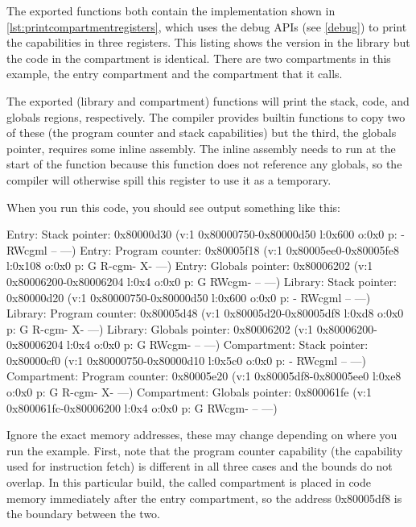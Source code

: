 \codelisting[filename=examples/library_or_compartment/interface.h,marker=exports,label=lst:exportcompartmentandlib,caption="A header defining library and compartment exports."]{}

The exported functions both contain the implementation shown in \ref{lst:printcompartmentregisters}, which uses the debug APIs (see \ref{debug}) to print the capabilities in three registers.
This listing shows the version in the library but the code in the compartment is identical.
There are two compartments in this example, the entry compartment and the compartment that it calls.

The exported (library and compartment) functions will print the stack, code, and globals regions, respectively.
The compiler provides builtin functions to copy two of these (the program counter and stack capabilities) but the third, the globals pointer, requires some inline assembly.
The inline assembly needs to run at the start of the function because this function does not reference any globals, so the compiler will otherwise spill this register to use it as a temporary.

\codelisting[filename=examples/library_or_compartment/library.cc,marker=library_implementation,label=lst:printcompartmentregisters,caption="A simple print function to introspect compartment state."]{}

When you run this code, you should see output something like this:

\begin{console}
Entry: Stack pointer: 0x80000d30 (v:1 0x80000750-0x80000d50 l:0x600 o:0x0 p: - RWcgml -- ---)
Entry: Program counter: 0x80005f18 (v:1 0x80005ee0-0x80005fe8 l:0x108 o:0x0 p: G R-cgm- X- ---)
Entry: Globals pointer: 0x80006202 (v:1 0x80006200-0x80006204 l:0x4 o:0x0 p: G RWcgm- -- ---)
Library: Stack pointer: 0x80000d20 (v:1 0x80000750-0x80000d50 l:0x600 o:0x0 p: - RWcgml -- ---)
Library: Program counter: 0x80005d48 (v:1 0x80005d20-0x80005df8 l:0xd8 o:0x0 p: G R-cgm- X- ---)
Library: Globals pointer: 0x80006202 (v:1 0x80006200-0x80006204 l:0x4 o:0x0 p: G RWcgm- -- ---)
Compartment: Stack pointer: 0x80000cf0 (v:1 0x80000750-0x80000d10 l:0x5c0 o:0x0 p: - RWcgml -- ---)
Compartment: Program counter: 0x80005e20 (v:1 0x80005df8-0x80005ee0 l:0xe8 o:0x0 p: G R-cgm- X- ---)
Compartment: Globals pointer: 0x800061fe (v:1 0x800061fc-0x80006200 l:0x4 o:0x0 p: G RWcgm- -- ---)
\end{console}

Ignore the exact memory addresses, these may change depending on where you run the example.
First, note that the program counter capability (the capability used for instruction fetch) is different in all three cases and the bounds do not overlap.
In this particular build, the called compartment is placed in code memory immediately after the entry compartment, so the address 0x80005df8 is the boundary between the two.

